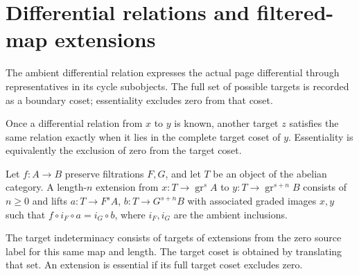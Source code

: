 \section{Differential relations and filtered-map extensions}

\begin{definition}
\label{sem:SpectralSequence:ambient-differential}
The ambient differential relation expresses the actual page differential through representatives in its cycle subobjects. The full set of possible targets is recorded as a boundary coset; essentiality excludes zero from that coset.
\end{definition}

\begin{theorem}
\label{sem:SpectralSequence:differential-coset}
Once a differential relation from $x$ to $y$ is known, another target $z$ satisfies the same relation exactly when it lies in the complete target coset of $y$. Essentiality is equivalently the exclusion of zero from the target coset.
\end{theorem}

\begin{definition}
\label{sem:SpectralSequence:extension-equation}
Let $f:A\to B$ preserve filtrations $F,G$, and let $T$ be an object of the abelian category. A length-$n$ extension from $x:T\to\operatorname{gr}^s A$ to $y:T\to\operatorname{gr}^{s+n}B$ consists of $n\geq0$ and lifts $a:T\to F^sA$, $b:T\to G^{s+n}B$ with associated graded images $x,y$ such that $f\circ i_F\circ a=i_G\circ b$, where $i_F,i_G$ are the ambient inclusions.
\end{definition}

\begin{definition}
\label{sem:SpectralSequence:extension-ambiguity}
The target indeterminacy consists of targets of extensions from the zero source label for this same map and length. The target coset is obtained by translating that set. An extension is essential if its full target coset excludes zero.
\end{definition}

